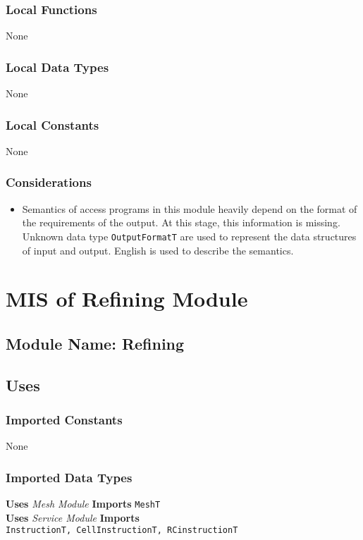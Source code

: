 \documentclass[12pt,titlepage]{article}
\begin{document}
\subsubsection{Local Functions} 
None
\subsubsection{Local Data Types} None
\subsubsection{Local Constants} None
\subsubsection{Considerations} 
\begin{itemize}
\item Semantics of access programs in this module heavily depend on the format of the requirements of the output. At this stage, this information is missing. Unknown data type {\tt OutputFormatT} are used to represent the data structures of input and output. English is used to describe the semantics.
\end{itemize}


\section{MIS of Refining Module \label{AmisSecRef}}

\subsection{Module Name: Refining}

\subsection{Uses}
\subsubsection{Imported Constants} None
\subsubsection{Imported Data Types} 
{\bf Uses}  \emph{Mesh Module}  {\bf Imports}  \texttt{MeshT} \\
{\bf Uses}  \emph{Service Module}  {\bf Imports} \\
\texttt{InstructionT, CellInstructionT, RCinstructionT}
\end{document}
